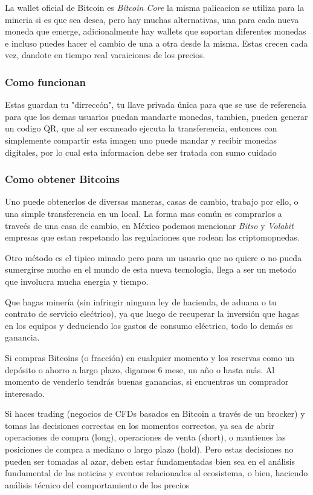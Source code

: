 \documentclass[12pt,letterpaper]{article}
\begin{document}
                La wallet oficial de Bitcoin es \textit{Bitcoin Core} la misma palicacion se utiliza para la mineria si es que sea desea, pero hay muchas alternativas, una para cada nueva moneda que emerge, adicionalmente hay wallets que soportan diferentes monedas e incluso puedes hacer el cambio de una a otra desde la misma. Estas crecen cada vez, dandote en tiempo real varaiciones de los precios.
                \subsubsection*{Como funcionan}
				Estas guardan tu "dirrecc\'on", tu llave privada \'unica para que se use de referencia para que los demas usuarios puedan mandarte monedas, tambien, pueden generar un codigo QR, que al ser escaneado ejecuta la transferencia, entonces con simplemente compartir esta imagen uno puede mandar y recibir monedas digitales, por lo cual esta informacion debe ser tratada con sumo cuidado                                
            \subsubsection*{Como obtener Bitcoins}
	Uno puede obtenerlos de diversas maneras, casas de cambio, trabajo por ello, o una simple transferencia en un local. La forma mas com\'un es comprarlos a trave\'es de una casa de cambio, en M\'exico podemos mencionar \textit{Bitso} y \textit{Volabit} empresas que estan respetando las regulaciones que rodean las criptomopnedas.
	
	Otro m\'etodo es el tipico minado pero para un usuario que no quiere o no pueda sumergirse mucho en el mundo de esta nueva tecnologia, llega a ser un metodo que involucra mucha energia y tiempo.
	
        Que hagas minería (sin infringir ninguna ley de hacienda, de aduana o tu contrato de servicio elećtrico), ya que luego de recuperar la inversión que hagas en los equipos y deduciendo los gastos de consumo eléctrico, todo lo demás es ganancia.

        Si compras Bitcoins (o fracción) en cualquier momento y los reservas como un depósito o ahorro a largo plazo, digamos 6 mese, un año o hasta más. Al momento de venderlo tendrás buenas ganancias, si encuentras un comprador interesado.

        Si haces trading (negocios de CFDs basados en Bitcoin a través de un brocker) y tomas las decisiones correctas en los momentos correctos, ya sea de abrir operaciones de compra (long), operaciones de venta (short), o mantienes las posiciones de compra a mediano o largo plazo (hold).
        Pero estas decisiones no pueden ser tomadas al azar, deben estar fundamentadas bien sea en el análisis fundamental de las noticias y eventos relacionados al ecosistema, o bien, haciendo análisis técnico del comportamiento de los precios
\end{document}
